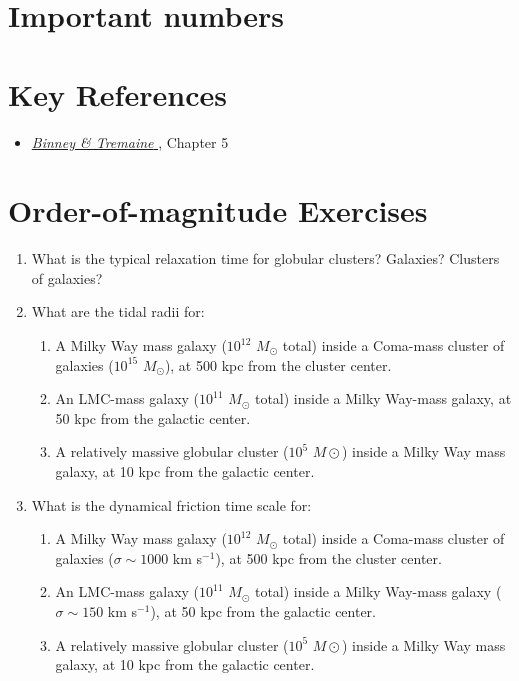 \section{Important numbers}

\section{Key References}

\begin{itemize}
  \item
    \href{http://adsabs.harvard.edu/abs/2000asqu.book.....C}{
    {\it Binney \& Tremaine}
      \citet{cox00a}}, Chapter 5
\end{itemize}

\section{Order-of-magnitude Exercises}

\begin{enumerate} 
\item What is the typical relaxation time for globular clusters?
    Galaxies? Clusters of galaxies?
\item What are the tidal radii for:
\begin{enumerate}
\item A Milky Way mass galaxy ($10^{12}$ $M_\odot$ total) inside a
Coma-mass cluster of galaxies ($10^{15}$ $M_\odot$), 
at 500 kpc from the cluster center.
\item An LMC-mass galaxy ($10^{11}$ $M_\odot$ total) inside a
Milky Way-mass galaxy, at 50 kpc from the galactic center.
\item A relatively massive globular cluster ($10^5$ $M\odot$) inside a
Milky Way mass galaxy, at 10 kpc from the galactic center.
\end{enumerate}
\item What is the dynamical friction time scale for:
\begin{enumerate}
\item A Milky Way mass galaxy ($10^{12}$ $M_\odot$ total) inside a
Coma-mass cluster of galaxies ($\sigma \sim 1000$ km s$^{-1}$), 
at 500 kpc from the cluster center.
\item An LMC-mass galaxy ($10^{11}$ $M_\odot$ total) inside a
Milky Way-mass galaxy ($\sigma\sim 150$ km s$^{-1}$), at 50 kpc from
the galactic center.
\item A relatively massive globular cluster ($10^5$ $M\odot$) inside a
Milky Way mass galaxy, at 10 kpc from the galactic center.
\end{enumerate}
\end{enumerate}   

